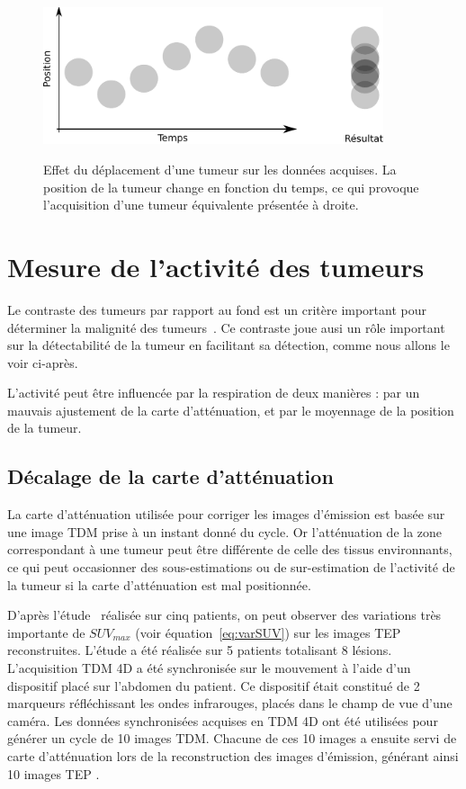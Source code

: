 \begin{figure}[h!]
    \begin{center}
            \includegraphics[width=10cm]{images/moyennageImage} \\
    \end{center}
    \caption{Effet du déplacement d'une tumeur sur les données acquises. La position de la tumeur change en fonction du temps, ce qui provoque l'acquisition d'une tumeur équivalente présentée à droite.}
    \label{fig:effetMvt}
\end{figure}


\section{Mesure de l'activité des tumeurs}

Le contraste des tumeurs par rapport au fond est un critère important pour déterminer la malignité des tumeurs~\cite{dimitrakopoulou2002role, krak2005effects}. Ce contraste joue ausi un rôle important sur la détectabilité de la tumeur en facilitant sa détection, comme nous allons le voir ci-après.

L'activité peut être influencée par la respiration de deux manières : par un mauvais ajustement de la carte d'atténuation, et par le moyennage de la position de la tumeur.

\subsection{Décalage de la carte d'atténuation}


La carte d'atténuation utilisée pour corriger les images d'émission est basée sur une image TDM prise à un instant donné du cycle. Or l'atténuation de la zone correspondant à une tumeur peut être différente de celle des tissus environnants, ce qui peut occasionner des sous-estimations ou de sur-estimation de l'activité de la tumeur si la carte d'atténuation est mal positionnée.

D'après l'étude~\cite{erdi2004ct} réalisée sur cinq patients, on peut observer des variations très importante de $SUV_{max}$ (voir équation~\ref{eq:varSUV}) sur les images TEP reconstruites. L'étude a été réalisée sur 5 patients totalisant 8 lésions. L'acquisition TDM 4D a été synchronisée sur le mouvement à l'aide d'un dispositif placé sur l'abdomen du patient. Ce dispositif était constitué de 2 marqueurs réfléchissant les ondes infrarouges, placés dans le champ de vue d'une caméra. Les données synchronisées acquises en TDM 4D ont été utilisées pour générer un cycle de 10 images TDM. Chacune de ces 10 images a ensuite servi de carte d'atténuation lors de la reconstruction des images d'émission, générant ainsi 10 images TEP .

